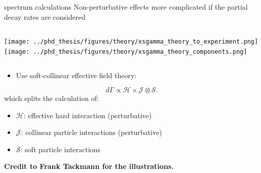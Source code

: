 \documentclass[xcolor=dvipsnames]{beamer}
\begin{document}
\begin{frame}{\safeBtoXsdgamma spectrum calculations}
\small
   Non-perturbative effects more complicated if the partial decay rates are considered

   \begin{columns}
      \texttt{[image: ../phd\_thesis/figures/theory/xsgamma\_theory\_to\_experiment.png]}
      \texttt{[image: ../phd\_thesis/figures/theory/xsgamma\_theory\_components.png]}
   \end{columns}

   \begin{itemize}
      \item Use soft-collinear effective field theory:
   \end{itemize}
   \begin{equation}\nonumber
      d\Gamma \propto \mathcal{H} \times \mathcal{J} \otimes \mathcal{S}.
  \end{equation}
  which splits the calculation of:
  \begin{itemize}
   \item[] {\color{red}$\mathcal{H}$: effective hard interaction (perturbative)}
   \item[] {\color{blue}$\mathcal{J}$: collinear particle interactions (perturbative)}
   \item[] {\color{orange}$\mathcal{S}$: soft particle interactions}
  \end{itemize}

\vspace{-10pt}

\begin{flushright}
   \tiny \textbf{Credit to Frank Tackmann for the illustrations.}
\end{flushright}

\end{frame}
\end{document}
